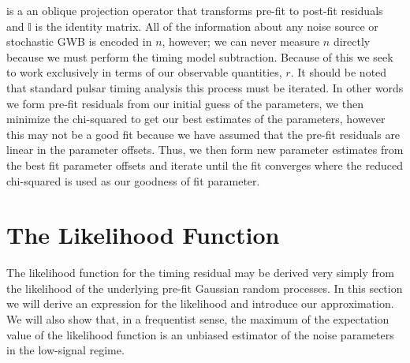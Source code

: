 \documentclass[iop]{emulateapj}
\begin{document}
is a an oblique projection operator that transforms pre-fit to post-fit residuals and $\mathbb{I}$ is the identity matrix. All of the information about any noise source or stochastic GWB is encoded in $n$, however; we can never measure $n$ directly because we must perform the timing model subtraction. Because of this we seek to work exclusively in terms of our observable quantities, $r$. It should be noted that standard pulsar timing analysis this process must be iterated. In other words we form pre-fit residuals from our initial guess of the parameters, we then minimize the chi-squared to get our best estimates of the parameters, however this may not be a good fit because we have assumed that the pre-fit residuals are linear in the parameter offsets. Thus, we then form new parameter estimates from the best fit parameter offsets and iterate until the fit converges where the reduced chi-squared is used as our goodness of fit parameter.


\section{The Likelihood Function}
\label{sec:likelihood}

The likelihood function for the timing residual may be derived very simply from the likelihood of the underlying pre-fit Gaussian random processes. 
In this section we will derive an expression for the likelihood and introduce our approximation. We will also show that, in a frequentist sense,
the maximum of the expectation value of the likelihood function
is an unbiased estimator of the noise parameters in the low-signal regime.
\end{document}
